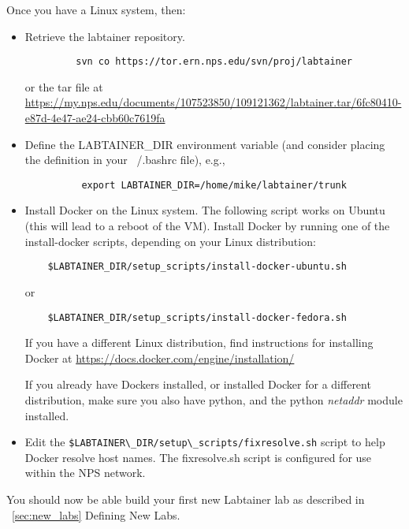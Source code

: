 \documentclass{article}
\begin{document}
Once you have a Linux system, then:
\begin{itemize}
\item Retrieve the labtainer repository.
\begin{verbatim}
         svn co https://tor.ern.nps.edu/svn/proj/labtainer
\end{verbatim}
or the tar file at
\url{https://my.nps.edu/documents/107523850/109121362/labtainer.tar/6fc80410-e87d-4e47-ae24-cbb60c7619fa}

\item Define the LABTAINER\_DIR environment variable (and consider
placing the definition in your ~/.bashrc file), e.g., 
\begin{verbatim}
          export LABTAINER_DIR=/home/mike/labtainer/trunk
\end{verbatim}

\item Install Docker on the Linux system.  The following script works on Ubuntu (this will lead to a reboot of the VM).
Install Docker by running one of the install-docker scripts, depending on your Linux
distribution:
\begin{verbatim}
    $LABTAINER_DIR/setup_scripts/install-docker-ubuntu.sh
\end{verbatim}
\noindent or 
\begin{verbatim}
    $LABTAINER_DIR/setup_scripts/install-docker-fedora.sh
\end{verbatim}
If you have a different Linux distribution, find instructions for installing Docker at
\url{https://docs.docker.com/engine/installation/}

If you already have Dockers installed, or installed Docker for a different distribution,
make sure you also have python, and
the python \textit{netaddr} module installed.

\item Edit the \verb!$LABTAINER\_DIR/setup\_scripts/fixresolve.sh! script to help Docker resolve
host names.  The fixresolve.sh script is configured for use within the NPS network.
\end{itemize}
You should now be able build your first new Labtainer lab as described
in ~\ref{sec:new_labs} Defining New Labs.
\end{document}
